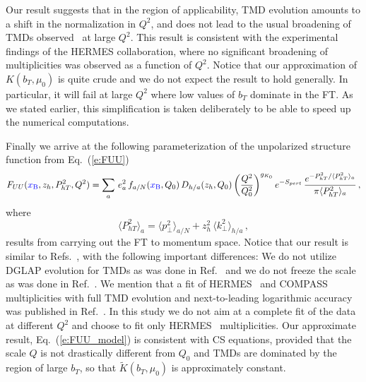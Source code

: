 \documentclass[final,3p,times,onecolumn,sort&compress,hidelinks]{elsarticle}
\newcommand{\xbj}{\ensuremath{{\cbl x_{\rm B}}}}
\newcommand\3[1]{\boldsymbol{#1}}
\newcommand{\crd}{\color{red}}
\newcommand{\cbl}{\color{blue}}
\begin{document}
Our result suggests that in the region of applicability, TMD evolution  amounts to a  shift in the normalization in $Q^2$, and does not lead to the usual broadening of TMDs observed~\cite{Collins:2011zzd} at large $Q^2$. This result is consistent with the experimental findings \cite{Airapetian:2012ki} of the  HERMES collaboration, where no significant broadening of multiplicities was observed as a function of $Q^2$. Notice that our approximation of $K(b_T,\mu_0)$ is  quite crude  and  we do not expect the result to hold  generally.  In particular, it will fail at large $Q^2$ where low values of $b_T$ dominate in the FT.  As we stated earlier, this simplification is taken deliberately to be able to speed up the numerical computations.


Finally we arrive at the following parameterization of the unpolarized structure function from Eq.~(\ref{e:FUU}) 
\begin{equation}
F_{UU}(\xbj,z_h,P_{hT}^2,Q^2)  =  \sum_{a} \, e_a^2 \,f_{a/N}(\xbj, Q_0)\,D_{h/a}(z_h, Q_0) \left( \frac{Q^2}{Q_0^2}\right)^{g_{K_0}}e^{-S_{pert}}\,
\frac{e^{-P_{hT}^2/\langle P_{hT}^2 \rangle_a}}{\pi\langle P_{hT}^2 \rangle_a}\,, \label{e:FUU_model}
\end{equation}
 where
\begin{equation}
\langle P_{hT}^2 \rangle_a = \langle p_\perp^2 \rangle_{a/N} + z_h^2\, \langle k_\perp^2 \rangle_{h/a}\,, \label{e:avg_kT}
\end{equation}
results from carrying out the  FT to momentum space.
Notice that our result is similar to Refs.~\cite{Anselmino:2013lza,Signori:2013mda}, with the following important differences:
We do not utilize DGLAP evolution for TMDs as was done in Ref.~\cite{Anselmino:2013lza} and we do not freeze the scale as was done in Ref.~\cite{Signori:2013mda}. We mention that a fit of HERMES~\cite{Airapetian:2012ki}  and COMPASS~\cite{Adolph:2013stb} multiplicities with full TMD evolution and next-to-leading logarithmic accuracy was published in Ref.~\cite{Bacchetta:2017gcc}. In this study we do not aim at a complete fit of the data at different $Q^2$ and choose to fit only HERMES~\cite{Airapetian:2012ki} multiplicities.
Our  approximate result, Eq.~(\ref{e:FUU_model}) is consistent with CS equations, provided that the scale $Q$ is not drastically different from $Q_0$ and TMDs are dominated by the region of large $b_T$, so that $\tilde K(b_T,\mu_0)$ is approximately constant.
\end{document}
